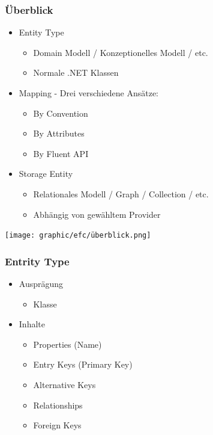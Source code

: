 \subsubsection{Überblick}
\begin{itemize}
    \item Entity Type
    \begin{itemize}
        \item Domain Modell / Konzeptionelles Modell / etc.
        \item Normale .NET Klassen
    \end{itemize}
    \item Mapping - Drei verschiedene Ansätze:
    \begin{itemize}
        \item By Convention
        \item By Attributes
        \item By Fluent API
    \end{itemize}
    \item Storage Entity
    \begin{itemize}
        \item Relationales Modell / Graph / Collection / etc.
        \item Abhängig von gewähltem Provider
    \end{itemize}
\end{itemize}
\vspace{-8pt}
\begin{center}
    \texttt{[image: graphic/efc/überblick.png]}
\end{center}
\vspace{-8pt}

\subsubsection{Entrity Type}
\begin{itemize}
    \item Ausprägung
    \begin{itemize}
        \item Klasse
    \end{itemize}
    \item Inhalte
    \begin{itemize}
        \item Properties (Name)
        \item Entry Keys (Primary Key)
        \item Alternative Keys
        \item Relationships
        \item Foreign Keys
    \end{itemize}
\end{itemize}

